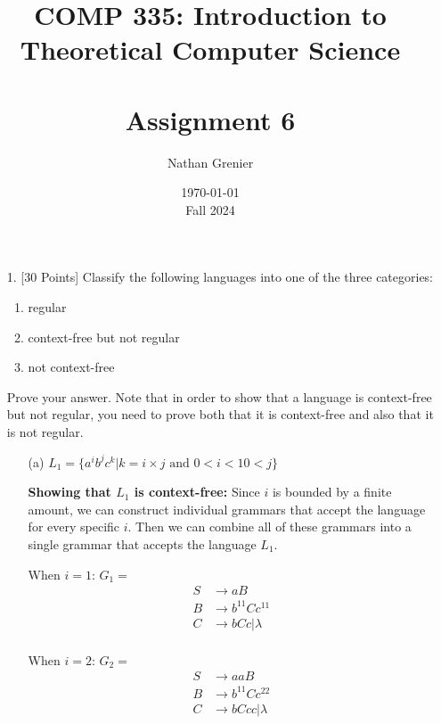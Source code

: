 \documentclass[12pt]{article}
\title{COMP 335: Introduction to Theoretical Computer Science\\
\ \\
Assignment 6}
\author{Nathan Grenier}
\date{\today \\ Fall 2024}
\begin{document}
\begin{spacing}{1.5}
      \maketitle

      \newpage

      \begin{enumerate}

            \item[1.] [30 Points] Classify the following languages into one of the three categories:
                  \begin{enumerate}
                        \item regular
                        \item context-free but not regular
                        \item not context-free
                  \end{enumerate}
                  Prove your answer. Note that in order to show that a language is context-free but not regular, you need to prove both that it is context-free and also that it is not regular.

                  \begin{enumerate}
                        \item[(a)] $L_1 = \{a^ib^jc^k | k=i\times j \text{ and } 0 < i < 10 < j\}$

                              \textbf{Showing that $L_1$ is context-free:}
                              Since $i$ is bounded by a finite amount, we can construct individual grammars that accept the language for every specific $i$. Then we can combine all of these grammars into a single grammar that accepts the language $L_1$.

                              When $i=1$: $G_1=$
                              \begin{align*}
                                    S & \rightarrow aB            \\
                                    B & \rightarrow b^{11}Cc^{11} \\
                                    C & \rightarrow bCc|\lambda   \\
                              \end{align*}

                              When $i=2$: $G_2=$
                              \begin{align*}
                                    S & \rightarrow aaB           \\
                                    B & \rightarrow b^{11}Cc^{22} \\
                                    C & \rightarrow bCcc|\lambda  \\
                              \end{align*}


\end{enumerate}
\end{enumerate}
\end{spacing}
\end{document}
